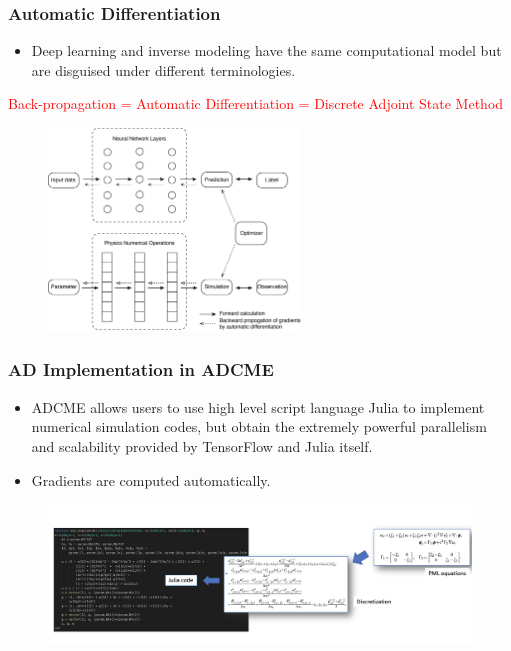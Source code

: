 \documentclass{beamer}
\begin{document}
\begin{frame}
	\frametitle{Automatic Differentiation}
	\begin{itemize}
		\item Deep learning and inverse modeling have the same computational model but are disguised under different terminologies.
	\end{itemize}
	\begin{center}
	\small
	\textcolor{red}{
		Back-propagation = Automatic Differentiation = Discrete Adjoint State Method}
	\end{center}
	\begin{figure}[hbt]
  \includegraphics[width=0.6\textwidth]{../compare-NN-PDE.png}
\end{figure}
\end{frame}

\begin{frame}
	\frametitle{AD Implementation in ADCME}
	\begin{itemize}
		\item ADCME allows users to use high level script language Julia to implement numerical simulation codes, but obtain the extremely powerful parallelism and scalability provided by TensorFlow and Julia itself.
		\item Gradients are computed automatically. 
	\end{itemize}
	\begin{figure}[hbt]
  \includegraphics[width=1.0\textwidth]{../Julia.png}
\end{figure}
\end{frame}
\end{document}
